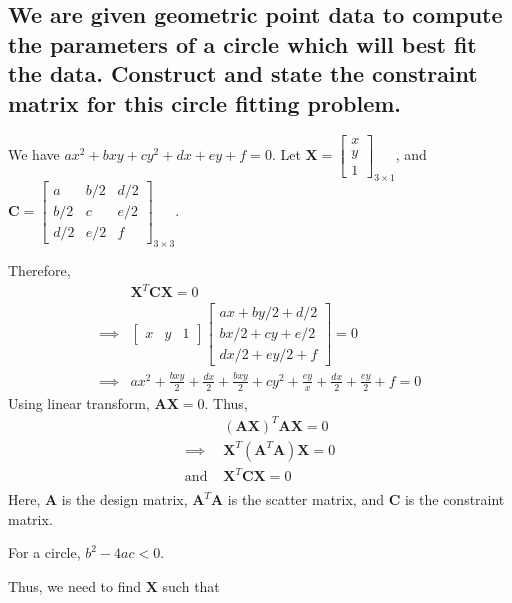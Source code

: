 \documentclass[a4paper]{article}
\begin{document}
\subsection{We are given geometric point data to compute the parameters of a circle which will best fit the data. Construct and state the constraint matrix for this circle fitting problem.}
We have $ax^2 + bxy + cy^2 + dx + ey + f = 0$.
Let $\mathbf{X} = \begin{bmatrix}
        x \\y\\1
    \end{bmatrix}_{3 \times 1}$, and $\mathbf{C}= \begin{bmatrix}
        a & b/2 & d/2 \\ b/2&c&e/2\\ d/2&e/2&f
    \end{bmatrix}_{3 \times 3}$.
\par Therefore,
\begin{align*}
             & \mathbf{X}^T\mathbf{C}\mathbf{X}=0                                                                              \\
    \implies & \begin{bmatrix}
        x & y & 1
    \end{bmatrix} \begin{bmatrix}
        ax + by/2 + d/2 \\  bx/2 + cy + e/2 \\ dx/2  + ey/2 + f
    \end{bmatrix} = 0                                                       \\
    \implies & ax^2 + \frac{bxy}{2} + \frac{dx}{2} + \frac{bxy}{2} + cy^2 + \frac{ey}{x} + \frac{dx}{2} + \frac{ey}{2} + f = 0
\end{align*}
Using linear transform, $\mathbf{A}\mathbf{X}=0$. Thus,
\begin{align*}
                & (\mathbf{A}\mathbf{X})^T \mathbf{A}\mathbf{X} = 0 \\
    \implies    & \mathbf{X}^T(\mathbf{A}^T\mathbf{A})\mathbf{X}=0  \\
    \text{and } & \mathbf{X}^T\mathbf{C}\mathbf{X}=0                \\
\end{align*}
Here, $\mathbf{A}$ is  the design matrix, $\mathbf{A}^T\mathbf{A}$ is the scatter matrix, and $\mathbf{C}$ is the constraint matrix.
\par For a circle, $b^2-4ac<0$.
\par Thus, we need to find $\mathbf{X}$ such that
\end{document}

